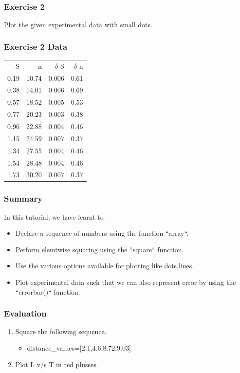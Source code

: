 \documentclass[presentation]{beamer}
\begin{document}
\begin{frame}
\frametitle{Exercise 2}
\label{sec-6}

  Plot the given experimental data with small dots.     
\end{frame}
\begin{frame}
\frametitle{Exercise 2 Data}
\label{sec-7}




\begin{center}
\begin{tabular}{rrrr}
    S  &      n  &  $\delta$ S  &  $\delta$ n  \\
 0.19  &  10.74  &       0.006  &        0.61  \\
 0.38  &  14.01  &       0.006  &        0.69  \\
 0.57  &  18.52  &       0.005  &        0.53  \\
 0.77  &  20.23  &       0.003  &        0.38  \\
 0.96  &  22.88  &       0.004  &        0.46  \\
 1.15  &  24.59  &       0.007  &        0.37  \\
 1.34  &  27.55  &       0.004  &        0.46  \\
 1.54  &  28.48  &       0.004  &        0.46  \\
 1.73  &  30.20  &       0.007  &        0.37  \\
\end{tabular}
\end{center}


  
\end{frame}
\begin{frame}
\frametitle{Summary}
\label{sec-8}

  In this tutorial, we have learnt to –

\begin{itemize}
\item Declare a sequence of numbers using the function ``array``.
\item Perform elemtwise squaring using the ``square`` function.
\item Use the various options available for plotting like dots,lines.
\item Plot experimental data such that we can also represent error by using the
    ``errorbar()`` function.
\end{itemize}
\end{frame}
\begin{frame}
\frametitle{Evaluation}
\label{sec-9}


\begin{enumerate}
\item Square the following sequence.
\begin{itemize}
\item distance\_values=[2.1,4.6,8.72,9.03]
\end{itemize}
\vspace{8pt}
\item Plot L v/s T in red plusses.
\end{enumerate}
\end{frame}
\end{document}

